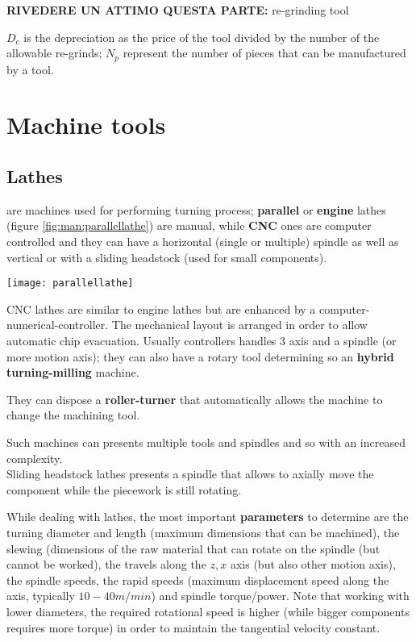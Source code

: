 		\textbf{RIVEDERE UN ATTIMO QUESTA PARTE:} re-grinding tool
		
		$D_c$ is the depreciation as the price of the tool divided by the number of the allowable re-grinds; $N_p$ represent the number of pieces that can be manufactured by a tool.
		
\section{Machine tools}
	\subsection{Lathes}
		 are machines used for performing turning process; \textbf{parallel} or \textbf{engine} lathes (figure \ref{fig:man:parallellathe}) are manual, while \textbf{CNC} ones are computer controlled and they can have a horizontal (single or multiple) spindle as well as vertical or with a sliding headstock (used for small components).
		
		\begin{SCfigure}[2][bht]
			\centering \texttt{[image: parallellathe]}
			\caption{schematic representation of a parallel (engine) lathe.} \label{fig:man:parallellathe}
		\end{SCfigure}
		
		CNC lathes are similar to engine lathes but are enhanced by a computer-numerical-controller. The mechanical layout is arranged in order to allow automatic chip evacuation. Usually controllers handles 3 axis and a spindle (or more motion axis); they can also have a rotary tool determining so an \textbf{hybrid turning-milling} machine.
		
		They can dispose a \textbf{roller-turner} that automatically allows the machine to change the machining tool.
		
		Such machines can presents multiple tools and spindles and so with an increased complexity.\\
		Sliding headstock lathes presents a spindle that allows to axially move the component while the piecework is still rotating.
		
		While dealing with lathes, the most important \textbf{parameters} to determine are the turning diameter and length (maximum dimensions that can be machined), the slewing (dimensions of the raw material that can rotate on the spindle (but cannot be worked), the travels along the $z,x$ axis (but also other motion axis), the spindle speeds, the rapid speeds (maximum displacement speed along the axis, typically $10-40 m/min$) and spindle torque/power. Note that working with lower diameters, the required rotational speed is higher (while bigger components requires more torque) in order to maintain the tangential velocity constant.
		
